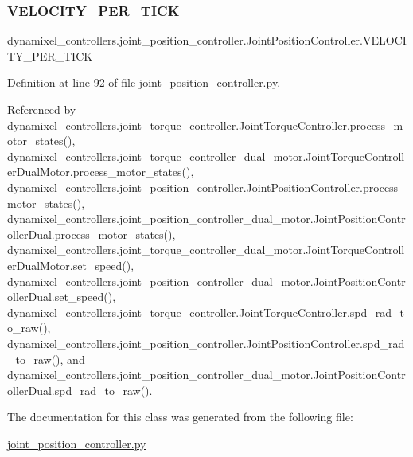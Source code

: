 \subsubsection{\texorpdfstring{V\+E\+L\+O\+C\+I\+T\+Y\+\_\+\+P\+E\+R\+\_\+\+T\+I\+CK}{VELOCITY\_PER\_TICK}}
{\footnotesize\ttfamily dynamixel\+\_\+controllers.\+joint\+\_\+position\+\_\+controller.\+Joint\+Position\+Controller.\+V\+E\+L\+O\+C\+I\+T\+Y\+\_\+\+P\+E\+R\+\_\+\+T\+I\+CK}



Definition at line 92 of file joint\+\_\+position\+\_\+controller.\+py.



Referenced by dynamixel\+\_\+controllers.\+joint\+\_\+torque\+\_\+controller.\+Joint\+Torque\+Controller.\+process\+\_\+motor\+\_\+states(), dynamixel\+\_\+controllers.\+joint\+\_\+torque\+\_\+controller\+\_\+dual\+\_\+motor.\+Joint\+Torque\+Controller\+Dual\+Motor.\+process\+\_\+motor\+\_\+states(), dynamixel\+\_\+controllers.\+joint\+\_\+position\+\_\+controller.\+Joint\+Position\+Controller.\+process\+\_\+motor\+\_\+states(), dynamixel\+\_\+controllers.\+joint\+\_\+position\+\_\+controller\+\_\+dual\+\_\+motor.\+Joint\+Position\+Controller\+Dual.\+process\+\_\+motor\+\_\+states(), dynamixel\+\_\+controllers.\+joint\+\_\+torque\+\_\+controller\+\_\+dual\+\_\+motor.\+Joint\+Torque\+Controller\+Dual\+Motor.\+set\+\_\+speed(), dynamixel\+\_\+controllers.\+joint\+\_\+position\+\_\+controller\+\_\+dual\+\_\+motor.\+Joint\+Position\+Controller\+Dual.\+set\+\_\+speed(), dynamixel\+\_\+controllers.\+joint\+\_\+torque\+\_\+controller.\+Joint\+Torque\+Controller.\+spd\+\_\+rad\+\_\+to\+\_\+raw(), dynamixel\+\_\+controllers.\+joint\+\_\+position\+\_\+controller.\+Joint\+Position\+Controller.\+spd\+\_\+rad\+\_\+to\+\_\+raw(), and dynamixel\+\_\+controllers.\+joint\+\_\+position\+\_\+controller\+\_\+dual\+\_\+motor.\+Joint\+Position\+Controller\+Dual.\+spd\+\_\+rad\+\_\+to\+\_\+raw().



The documentation for this class was generated from the following file\+:\begin{DoxyCompactItemize}
\item 
\hyperlink{joint__position__controller_8py}{joint\+\_\+position\+\_\+controller.\+py}\end{DoxyCompactItemize}
